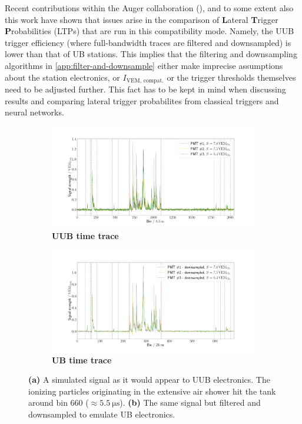 Recent contributions within the Auger collaboration (\cite{nitzTriggers, quentinComparison}), and to some extent also this work have shown that issues arise in the 
comparison of \textbf{L}ateral \textbf{T}rigger \textbf{P}robabilities (LTPs) that are run in this compatibility mode. Namely, the UUB trigger efficiency (where 
full-bandwidth traces are filtered and downsampled) is lower than that of UB stations. This implies that the filtering and downsampling algorithms in 
\autoref{app:filter-and-downsample} either make imprecise assumptions about the station electronics, or $I_\text{VEM, compat.}$ or the trigger thresholds 
themselves need to be adjusted further. This fact has to be kept in mind when discussing results and comparing lateral trigger probabilites from classical triggers
and neural networks. 

\begin{figure}
	\begin{subfigure}[b]{0.5\textwidth}
		\centering
		\includegraphics[width=\textwidth]{./plots/time_trace_UUB.png}
		\caption{\textbf{UUB time trace}}
		\label{fig:uub-time-trace}
	\end{subfigure}
	\hfill
	\begin{subfigure}[b]{0.5\textwidth}
		\centering
		\includegraphics[width=\textwidth]{./plots/time_trace_UB.png}
		\caption{\textbf{UB time trace}}
		\label{fig:ub-time-trace}
	\end{subfigure}
	\caption{\textbf{(a)} A simulated signal as it would appear to UUB electronics. The ionizing particles originating in the extensive air shower hit the tank 
	around bin 660 ($\approx\SI{5.5}{\micro\second}$). \textbf{(b)} The same signal but filtered and downsampled to emulate UB electronics.}
	\label{fig:uub-ub-comparison}
\end{figure}

